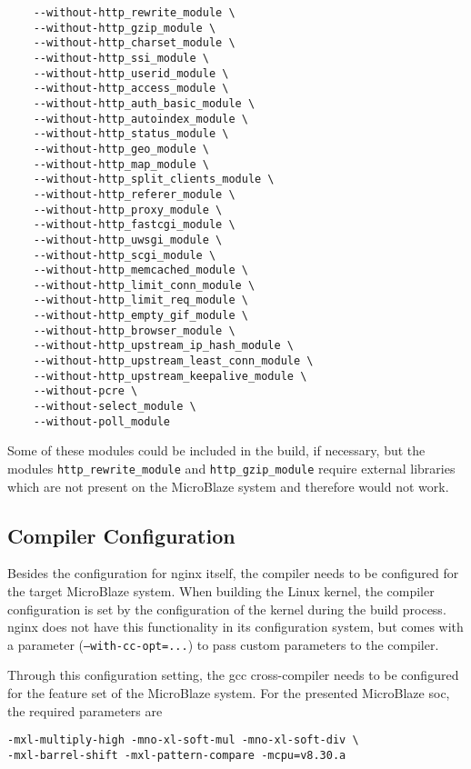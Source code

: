 \begin{verbatim}
    --without-http_rewrite_module \
    --without-http_gzip_module \
    --without-http_charset_module \
    --without-http_ssi_module \
    --without-http_userid_module \
    --without-http_access_module \
    --without-http_auth_basic_module \
    --without-http_autoindex_module \
    --without-http_status_module \
    --without-http_geo_module \
    --without-http_map_module \
    --without-http_split_clients_module \
    --without-http_referer_module \
    --without-http_proxy_module \
    --without-http_fastcgi_module \
    --without-http_uwsgi_module \
    --without-http_scgi_module \
    --without-http_memcached_module \
    --without-http_limit_conn_module \
    --without-http_limit_req_module \
    --without-http_empty_gif_module \
    --without-http_browser_module \
    --without-http_upstream_ip_hash_module \
    --without-http_upstream_least_conn_module \
    --without-http_upstream_keepalive_module \
    --without-pcre \
    --without-select_module \
    --without-poll_module
\end{verbatim}

Some of these modules could be included in the build, if necessary, but the modules \texttt{http\_rewrite\_module} and \texttt{http\_gzip\_module} require external libraries which are not present on the MicroBlaze system and therefore would not work.

\subsection{Compiler Configuration}

Besides the configuration for nginx itself, the compiler needs to be configured for the target MicroBlaze system. When building the Linux kernel, the compiler configuration is set by the configuration of the kernel during the build process. nginx does not have this functionality in its configuration system, but comes with a parameter (\texttt{--with-cc-opt=...}) to pass custom parameters to the compiler.

Through this configuration setting, the gcc cross-compiler needs to be configured for the feature set of the MicroBlaze system. For the presented MicroBlaze \gls{soc}, the required parameters are

\begin{verbatim}
-mxl-multiply-high -mno-xl-soft-mul -mno-xl-soft-div \
-mxl-barrel-shift -mxl-pattern-compare -mcpu=v8.30.a
\end{verbatim}

